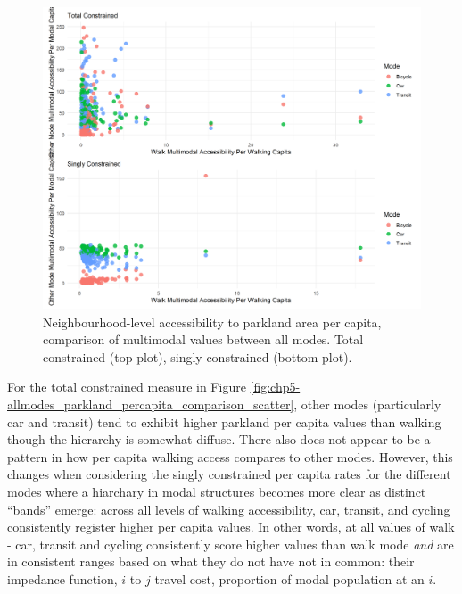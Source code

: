 \documentclass[
11pt, %
oneside, %
english, %
singlespacing, %
]{macthesis} %
\begin{document}
\begin{figure}

{\centering \includegraphics[width=6in]{./data/figures/chp5-allmodes_parkland_percapita_comparison_scatter} 

}

\caption{\label{fig:chp5-allmodes_parkland_percapita_comparison_scatter}Neighbourhood-level accessibility to parkland area per capita, comparison of multimodal values between all modes. Total constrained (top plot), singly constrained (bottom plot).}\label{fig:unnamed-chunk-81}
\end{figure}

For the total constrained measure in Figure \ref{fig:chp5-allmodes_parkland_percapita_comparison_scatter}, other modes (particularly car and transit) tend to exhibit higher parkland per capita values than walking though the hierarchy is somewhat diffuse. There also does not appear to be a pattern in how per capita walking access compares to other modes. However, this changes when considering the singly constrained per capita rates for the different modes where a hiarchary in modal structures becomes more clear as distinct ``bands'' emerge: across all levels of walking accessibility, car, transit, and cycling consistently register higher per capita values. In other words, at all values of walk - car, transit and cycling consistently score higher values than walk mode \emph{and} are in consistent ranges based on what they do not have not in common: their impedance function, \(i\) to \(j\) travel cost, proportion of modal population at an \(i\).
\end{document}
